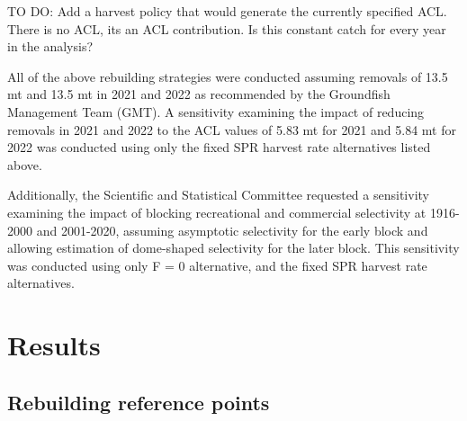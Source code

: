 \documentclass[11pt,
  english,
  a4paper,
]{article}
\begin{document}

TO DO: Add a harvest policy that would generate the currently specified ACL. There is no ACL, its an ACL contribution. Is this constant catch for every year in the analysis?

\leavevmode\tagmcend\tagstructend\par


All of the above rebuilding strategies were conducted assuming removals of 13.5 mt and 13.5 mt in 2021 and 2022 as recommended by the Groundfish Management Team (GMT). A sensitivity examining the impact of reducing removals in 2021 and 2022 to the ACL values of 5.83 mt for 2021 and 5.84 mt for 2022 was conducted using only the fixed SPR harvest rate alternatives listed above.

\leavevmode\tagmcend\tagstructend\par


Additionally, the Scientific and Statistical Committee requested a sensitivity examining the impact of blocking recreational and commercial selectivity at 1916-2000 and 2001-2020, assuming asymptotic selectivity for the early block and allowing estimation of dome-shaped selectivity for the later block. This sensitivity was conducted using only F = 0 alternative, and the fixed SPR harvest rate alternatives.

\leavevmode\tagmcend\tagstructend\par


\hypertarget{results}{%
\section{Results}\label{results}}

\leavevmode\tagmcend\tagstructend


\hypertarget{rebuilding-reference-points}{%
\subsection{Rebuilding reference points}\label{rebuilding-reference-points}}

\leavevmode\tagmcend\tagstructend

\end{document}
